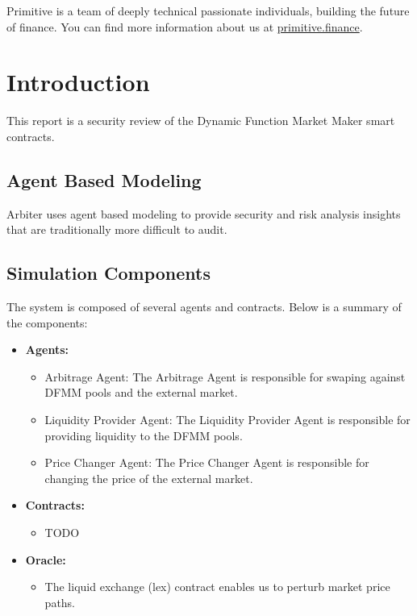 \documentclass[14pt]{extarticle}
\begin{document}
Primitive is a team of deeply technical passionate individuals, building
the future of finance.
You can find more information about us at \href{https://primitive.finance}{primitive.finance}.

\section{Introduction}\label{introduction}

This report is a security review of the Dynamic Function Market Maker smart contracts.

\subsection{Agent Based Modeling}\label{agent-based-modeling}

Arbiter uses agent based modeling to provide security
and risk analysis insights that are traditionally more difficult to
audit.

\subsection{Simulation Components}\label{simulation-components}

The system is composed of several agents and contracts. Below is a summary of the components:

\begin{itemize}
\item \textbf{Agents:}
  \begin{itemize}
  \item Arbitrage Agent: The Arbitrage Agent is responsible for swaping against DFMM pools and the external market.
  \item Liquidity Provider Agent: The Liquidity Provider Agent is responsible for providing liquidity to the DFMM pools.
  \item Price Changer Agent: The Price Changer Agent is responsible for changing the price of the external market.
  \end{itemize}
\item \textbf{Contracts:}
  \begin{itemize}
  \item TODO
  \end{itemize}
\item \textbf{Oracle:}
  \begin{itemize}
  \item The liquid exchange (lex) contract enables us to perturb market price paths.
  \end{itemize}
\end{itemize}
\end{document}
